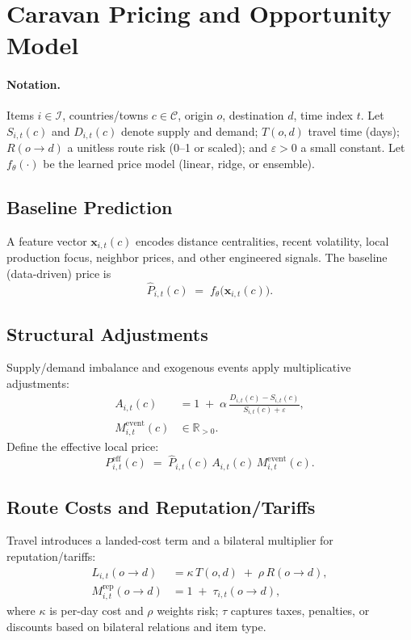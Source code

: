 \documentclass{article}
\begin{document}
\section*{Caravan Pricing and Opportunity Model}

\paragraph{Notation.}
Items $i \in \mathcal{I}$, countries/towns $c \in \mathcal{C}$, origin $o$, destination $d$, time index $t$.
Let $S_{i,t}(c)$ and $D_{i,t}(c)$ denote supply and demand; $T(o,d)$ travel time (days);
$R(o\!\to\! d)$ a unitless route risk (0--1 or scaled); and $\varepsilon>0$ a small constant.
Let $f_\theta(\cdot)$ be the learned price model (linear, ridge, or ensemble).

\subsection*{Baseline Prediction}
A feature vector $\mathbf{x}_{i,t}(c)$ encodes distance centralities, recent volatility, local production focus,
neighbor prices, and other engineered signals. The baseline (data-driven) price is
\begin{equation}
\hat P_{i,t}(c) \;=\; f_\theta\!\big(\mathbf{x}_{i,t}(c)\big).
\end{equation}

\subsection*{Structural Adjustments}
Supply/demand imbalance and exogenous events apply multiplicative adjustments:
\begin{align}
A_{i,t}(c) &= 1 \;+\; \alpha \,\frac{D_{i,t}(c)-S_{i,t}(c)}{S_{i,t}(c)+\varepsilon}, \\[4pt]
M^{\mathrm{event}}_{i,t}(c) &\in \mathbb{R}_{>0}.
\end{align}
Define the effective local price:
\begin{equation}
P^{\mathrm{eff}}_{i,t}(c) \;=\; \hat P_{i,t}(c)\,A_{i,t}(c)\,M^{\mathrm{event}}_{i,t}(c).
\end{equation}

\subsection*{Route Costs and Reputation/Tariffs}
Travel introduces a landed-cost term and a bilateral multiplier for reputation/tariffs:
\begin{align}
L_{i,t}(o\!\to\! d) &= \kappa\,T(o,d) \;+\; \rho\,R(o\!\to\! d), \\[4pt]
M^{\mathrm{rep}}_{i,t}(o\!\to\! d) &= 1 \;+\; \tau_{i,t}(o\!\to\! d),
\end{align}
where $\kappa$ is per-day cost and $\rho$ weights risk; $\tau$ captures taxes, penalties, or discounts based on bilateral relations and item type.
\end{document}
